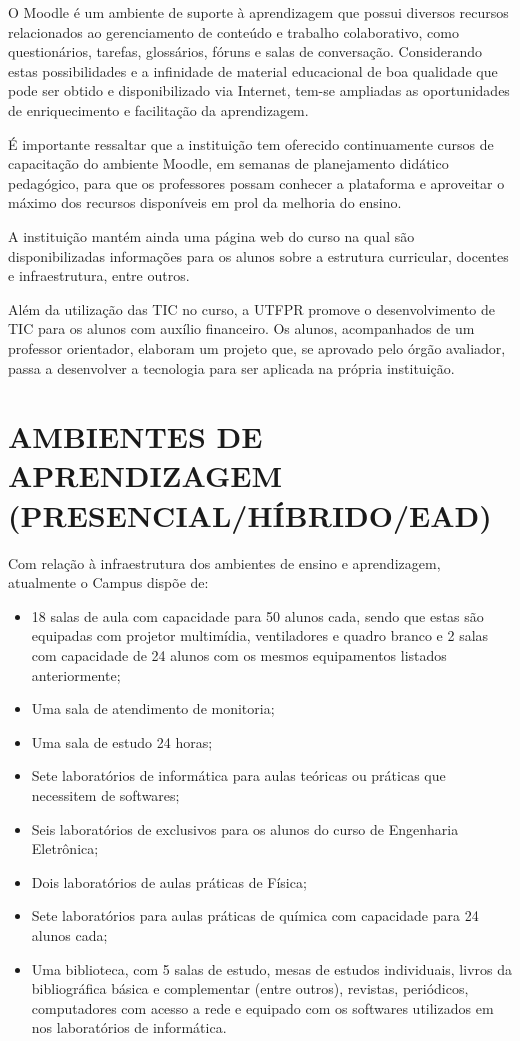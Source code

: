O Moodle é um ambiente de suporte à aprendizagem que possui diversos recursos relacionados ao gerenciamento de conteúdo e trabalho colaborativo, como questionários, tarefas, glossários, fóruns e salas de conversação. Considerando estas possibilidades e a infinidade de material educacional de boa qualidade que pode ser obtido e disponibilizado via Internet, tem-se ampliadas as oportunidades de enriquecimento e facilitação da aprendizagem.

É importante ressaltar que a instituição tem oferecido continuamente cursos de capacitação do ambiente Moodle, em semanas de planejamento didático pedagógico, para que os professores possam conhecer a plataforma e aproveitar o máximo dos recursos disponíveis em prol da melhoria do ensino.

A instituição mantém ainda uma página web do curso na qual são disponibilizadas informações para os alunos sobre a estrutura curricular, docentes e infraestrutura, entre outros.

Além da utilização das TIC no curso, a UTFPR promove o desenvolvimento de TIC para os alunos com auxílio financeiro. Os alunos, acompanhados de um professor orientador, elaboram um projeto que, se aprovado pelo órgão avaliador, passa a desenvolver a tecnologia para ser aplicada na própria instituição.


\section{AMBIENTES DE APRENDIZAGEM (PRESENCIAL/HÍBRIDO/EAD)}
\label{sec:amb}

Com relação à infraestrutura dos ambientes de ensino e aprendizagem, atualmente o Campus dispõe de:

\begin{itemize}
    \item 18 salas de aula com capacidade para 50 alunos cada, sendo que estas são equipadas com projetor multimídia, ventiladores e quadro branco e 2 salas com capacidade de 24 alunos com os mesmos equipamentos listados anteriormente;
    \item Uma sala de atendimento de monitoria;
    \item Uma sala de estudo 24 horas;
    \item Sete laboratórios de informática para aulas teóricas ou práticas que necessitem de softwares;
    \item Seis laboratórios de exclusivos para os alunos do curso de Engenharia Eletrônica;
    \item Dois laboratórios de aulas práticas de Física;
    \item Sete laboratórios para aulas práticas de química com capacidade para 24 alunos cada;
    \item Uma biblioteca, com 5 salas de estudo, mesas de estudos individuais, livros da bibliográfica básica e complementar (entre outros), revistas, periódicos, computadores com acesso a rede e equipado com os softwares utilizados em nos laboratórios de informática.
\end{itemize}

